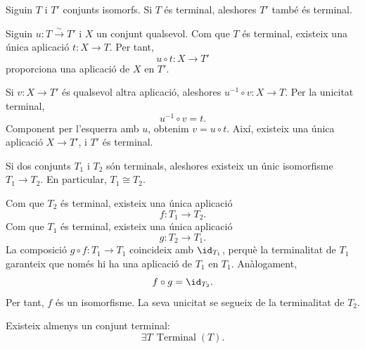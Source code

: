 \begin{proposicio}\label{prop:terminal-invariant-iso}
Siguin \(T\) i \(T'\) conjunts isomorfs. Si \(T\) és terminal, aleshores \(T'\) també és terminal.
\end{proposicio}

\begin{prova}
Siguin \(u:T\xrightarrow{\sim}T'\) i \(X\) un conjunt qualsevol. Com que \(T\) és terminal, existeix una única aplicació \(t:X\to T\). Per tant,
\[
u\circ t:X\to T'
\]
proporciona una aplicació de \(X\) en \(T'\).

Si \(v:X\to T'\) és qualsevol altra aplicació, aleshores \(u^{-1}\circ v:X\to T\). Per la unicitat terminal,
\[
u^{-1}\circ v=t.
\]
Component per l'esquerra amb \(u\), obtenim \(v=u\circ t\). Així, existeix una única aplicació \(X\to T'\), i \(T'\) és terminal.
\end{prova}

\begin{proposicio}\label{prop:terminal-unic}
Si dos conjunts \(T_1\) i \(T_2\) són terminals, aleshores existeix un únic isomorfisme \(T_1\to T_2\). En particular, \(T_1\cong T_2\).
\end{proposicio}

\begin{prova}
Com que \(T_2\) és terminal, existeix una única aplicació
\[
f:T_1\to T_2.
\]
Com que \(T_1\) és terminal, existeix una única aplicació
\[
g:T_2\to T_1.
\]
La composició \(g\circ f:T_1\to T_1\) coincideix amb \(\id_{T_1}\), perquè la terminalitat de \(T_1\) garanteix que només hi ha una aplicació de \(T_1\) en \(T_1\). Anàlogament,
\[
f\circ g=\id_{T_2}.
\]
Per tant, \(f\) és un isomorfisme. La seva unicitat se segueix de la terminalitat de \(T_2\).
\end{prova}

\begin{axioma}\label{ax:terminal-existencia}
Existeix almenys un conjunt terminal:
\[
\exists T\,\operatorname{Terminal}(T).
\]
\end{axioma}

